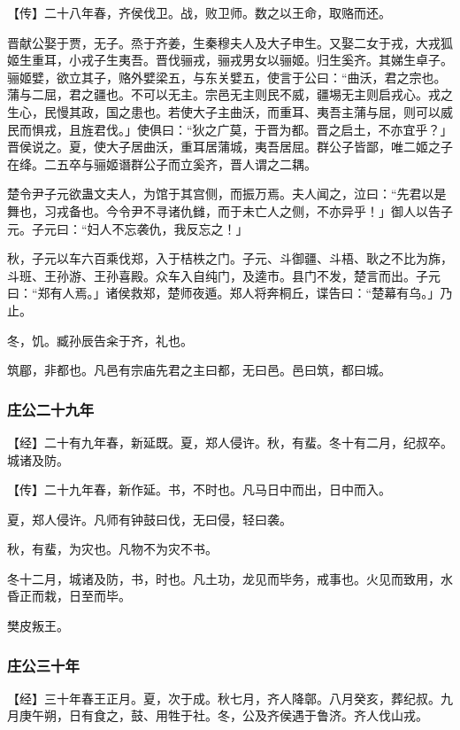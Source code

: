 \documentclass[]{article}
\begin{document}
【传】二十八年春，齐侯伐卫。战，败卫师。数之以王命，取赂而还。

晋献公娶于贾，无子。烝于齐姜，生秦穆夫人及大子申生。又娶二女于戎，大戎狐姬生重耳，小戎子生夷吾。晋伐骊戎，骊戎男女以骊姬。归生奚齐。其娣生卓子。骊姬嬖，欲立其子，赂外嬖梁五，与东关嬖五，使言于公曰：``曲沃，君之宗也。蒲与二屈，君之疆也。不可以无主。宗邑无主则民不威，疆埸无主则启戎心。戎之生心，民慢其政，国之患也。若使大子主曲沃，而重耳、夷吾主蒲与屈，则可以威民而惧戎，且旌君伐。」使俱曰：``狄之广莫，于晋为都。晋之启土，不亦宜乎？」晋侯说之。夏，使大子居曲沃，重耳居蒲城，夷吾居屈。群公子皆鄙，唯二姬之子在绛。二五卒与骊姬谮群公子而立奚齐，晋人谓之二耦。

楚令尹子元欲蛊文夫人，为馆于其宫侧，而振万焉。夫人闻之，泣曰：``先君以是舞也，习戎备也。今令尹不寻诸仇雠，而于未亡人之侧，不亦异乎！」御人以告子元。子元曰：``妇人不忘袭仇，我反忘之！」

秋，子元以车六百乘伐郑，入于桔柣之门。子元、斗御疆、斗梧、耿之不比为旆，斗班、王孙游、王孙喜殿。众车入自纯门，及逵市。县门不发，楚言而出。子元曰：``郑有人焉。」诸侯救郑，楚师夜遁。郑人将奔桐丘，谍告曰：``楚幕有乌。」乃止。

冬，饥。臧孙辰告籴于齐，礼也。

筑郿，非都也。凡邑有宗庙先君之主曰都，无曰邑。邑曰筑，都曰城。

\hypertarget{header-n577}{%
\subsubsection{庄公二十九年 }\label{header-n577}}

【经】二十有九年春，新延既。夏，郑人侵许。秋，有蜚。冬十有二月，纪叔卒。城诸及防。

【传】二十九年春，新作延。书，不时也。凡马日中而出，日中而入。

夏，郑人侵许。凡师有钟鼓曰伐，无曰侵，轻曰袭。

秋，有蜚，为灾也。凡物不为灾不书。

冬十二月，城诸及防，书，时也。凡土功，龙见而毕务，戒事也。火见而致用，水昏正而栽，日至而毕。

樊皮叛王。

\hypertarget{header-n586}{%
\subsubsection{庄公三十年}\label{header-n586}}

【经】三十年春王正月。夏，次于成。秋七月，齐人降鄣。八月癸亥，葬纪叔。九月庚午朔，日有食之，鼓、用牲于社。冬，公及齐侯遇于鲁济。齐人伐山戎。
\end{document}
